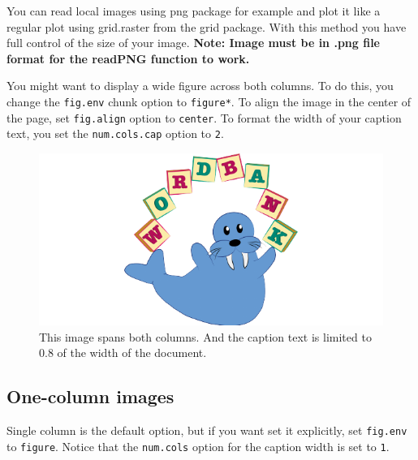 \documentclass[10pt, letterpaper]{article}
\newenvironment{CodeChunk}{}{}
\begin{document}
You can read local images using png package for example and plot it like
a regular plot using grid.raster from the grid package. With this method
you have full control of the size of your image. \textbf{Note: Image
must be in .png file format for the readPNG function to work.}

You might want to display a wide figure across both columns. To do this,
you change the \texttt{fig.env} chunk option to \texttt{figure*}. To
align the image in the center of the page, set \texttt{fig.align} option
to \texttt{center}. To format the width of your caption text, you set
the \texttt{num.cols.cap} option to \texttt{2}.

\begin{CodeChunk}
\begin{figure}[h]

{\centering \includegraphics{figs/2-col-image-1} 

}

\caption[This image spans both columns]{This image spans both columns. And the caption text is limited to 0.8 of the width of the document.}\label{fig:2-col-image}
\end{figure}
\end{CodeChunk}

\subsection{One-column images}\label{one-column-images}

Single column is the default option, but if you want set it explicitly,
set \texttt{fig.env} to \texttt{figure}. Notice that the
\texttt{num.cols} option for the caption width is set to \texttt{1}.
\end{document}
